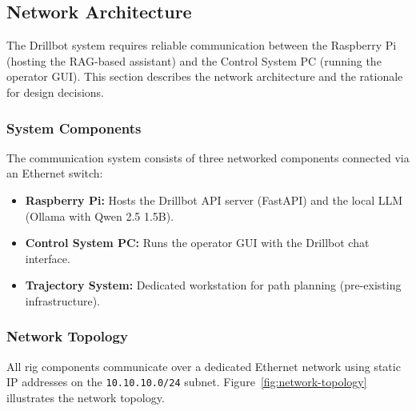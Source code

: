
\subsection{Network Architecture}
\label{sec:network-architecture}

The Drillbot system requires reliable communication between the Raspberry Pi (hosting the RAG-based assistant) and the Control System PC (running the operator GUI). This section describes the network architecture and the rationale for design decisions.

\subsubsection{System Components}

The communication system consists of three networked components connected via an Ethernet switch:

\begin{itemize}
    \item \textbf{Raspberry Pi:} Hosts the Drillbot API server (FastAPI) and the local LLM (Ollama with Qwen 2.5 1.5B).
    \item \textbf{Control System PC:} Runs the operator GUI with the Drillbot chat interface.
    \item \textbf{Trajectory System:} Dedicated workstation for path planning (pre-existing infrastructure).
\end{itemize}

\subsubsection{Network Topology}

All rig components communicate over a dedicated Ethernet network using static IP addresses on the \texttt{10.10.10.0/24} subnet. Figure~\ref{fig:network-topology} illustrates the network topology.

